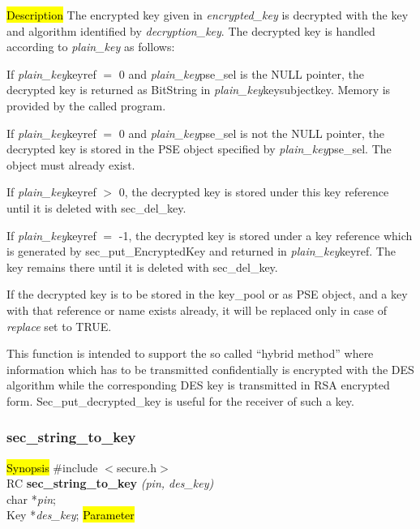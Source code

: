 


\hl{Description}
The encrypted key given in {\em encrypted\_key} is decrypted with the key and algorithm identified by
{\em decryption\_key}. The decrypted key is handled according to {\em plain\_key} as follows: 

If {\em plain\_key}\pf keyref $=$ 0 and {\em plain\_key}\pf pse\_sel is the NULL pointer, the decrypted key is
returned as BitString in {\em plain\_key}\pf key\pf subjectkey. Memory is provided by the called program. 

If {\em plain\_key}\pf keyref $=$ 0 and {\em plain\_key}\pf pse\_sel is not the NULL pointer, the decrypted key
is stored in the PSE object specified by {\em plain\_key}\pf pse\_sel. The object must already exist. 

If {\em plain\_key}\pf keyref $>$ 0, the decrypted key is stored under this key reference until it is
deleted with sec\_del\_key. 

If {\em plain\_key}\pf keyref $=$ -1, the decrypted key is stored under a key reference which is generated 
by sec\_put\_EncryptedKey and returned in {\em plain\_key}\pf keyref. The key remains there until it is deleted
with sec\_del\_key. 

If the decrypted key is to be stored in the key\_pool or as PSE object, and a key with that
reference or name exists already, it will be replaced only in case of {\em replace} set to TRUE.

This function is intended to support the so called ``hybrid method'' where information which
has to be transmitted confidentially is encrypted with the DES algorithm while the corresponding DES key
is transmitted in RSA encrypted form. Sec\_put\_decrypted\_key is useful for the receiver
of such a key.

\subsubsection{sec\_string\_to\_key}
\label{sec_string_to_key}
\hl{Synopsis}
\#include $<$secure.h$>$ \\ [0.5cm]
RC {\bf sec\_string\_to\_key} {\em (pin, des\_key)} \\
char *{\em pin}; \\
Key *{\em des\_key};
\hl{Parameter}

